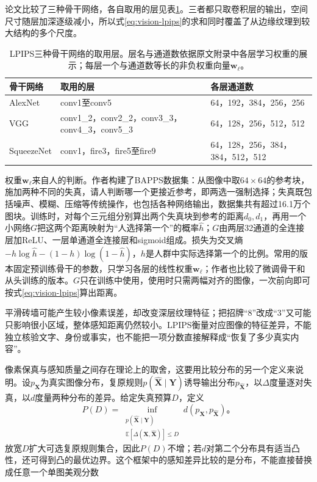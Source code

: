 论文比较了三种骨干网络，各自取用的层见表\ref{tab:vision-lpips-layers}。三者都只取卷积层的输出，空间尺寸随层加深逐级减小，所以式\eqref{eq:vision-lpips}的求和同时覆盖了从边缘纹理到较大结构的多个尺度。

\begin{table}[htbp]
 \centering
 \small
 \begin{tabularx}{\linewidth}{@{}p{16mm}Xp{30mm}@{}}
  \toprule
  骨干网络 & 取用的层 & 各层通道数\\
  \midrule
  AlexNet & conv1至conv5 & 64，192，384，256，256\\
  VGG & conv1\_2，conv2\_2，conv3\_3，conv4\_3，conv5\_3 & 64，128，256，512，512\\
  SqueezeNet & conv1，fire3，fire5至fire9 & 64，128，256，384，384，512，512\\
  \bottomrule
 \end{tabularx}
 \caption{LPIPS三种骨干网络的取用层。层名与通道数依据原文附录中各层学习权重的展示；每层一个与通道数等长的非负权重向量$\bm{w}_\ell$。}
 \label{tab:vision-lpips-layers}
\end{table}

权重$\bm{w}_\ell$来自人的判断。作者构建了BAPPS数据集：从图像中取$64\times64$的参考块，施加两种不同的失真，请人判断哪一个更接近参考，即两选一强制选择；失真既包括噪声、模糊、压缩等传统操作，也包括各种网络输出，数据集共有超过16.1万个图块。训练时，对每个三元组分别算出两个失真块到参考的距离$d_0,d_1$，再用一个小网络$G$把这两个距离映射为“人选择第一个”的概率$\hat h$；$G$由两层32通道的全连接层加ReLU、一层单通道全连接层和sigmoid组成。损失为交叉熵$-h\log\hat h-(1-h)\log(1-\hat h)$，$h$是人群中实际选择第一个的比例。常用的版本固定预训练骨干的参数，只学习各层的线性权重$\bm{w}_\ell$；作者也比较了微调骨干和从头训练的版本。$G$只在训练中使用，使用时只需两幅对齐的图像，一次前向即可按式\eqref{eq:vision-lpips}算出距离。

平滑砖墙可能产生较小像素误差，却改变深层纹理特征；把招牌“8”改成“3”又可能只影响很小区域，整体感知距离仍然较小。LPIPS衡量对应图像的特征差异，不能独立核验文字、身份或事实，也不能把一项分数直接解释成“恢复了多少真实内容”。

像素保真与感知质量之间存在理论上的取舍，这要用比较分布的另一个定义来说明。设$p_{\bm{X}}$为真实图像分布，复原规则$p(\widehat{\bm{X}}\mid\bm{Y})$诱导输出分布$p_{\widehat{\bm{X}}}$，以$\Delta$度量逐对失真，以$d$度量两种分布的差异。给定失真预算$D$，定义
\begin{equation}
 P(D)=
 \inf_{\substack{p(\widehat{\bm{X}}\mid\bm{Y})\\
  \mathbb{E}[\Delta(\bm{X},\widehat{\bm{X}})]\leq D}}
 d(p_{\bm{X}},p_{\widehat{\bm{X}}})\text{。}
 \label{eq:vision-perception-distortion}
\end{equation}
放宽$D$扩大可选复原规则集合，因此$P(D)$不增；若$d$对第二个分布具有适当凸性，还可得到凸的最优边界。这个框架中的感知差异比较的是分布，不能直接替换成任意一个单图美观分数

